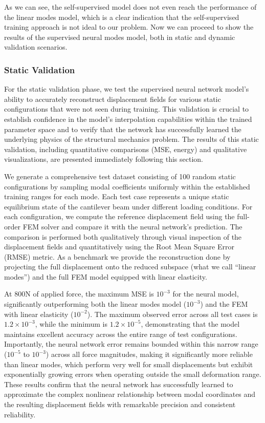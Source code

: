 As we can see, the self-supervised model does not even reach the performance of the linear modes model, which is a clear indication that the self-supervised training approach is not ideal to our problem. Now we can proceed to show the results of the supervised neural modes model, both in static and dynamic validation scenarios.

\subsubsection{Static Validation}
\label{sec:static_validation}
For the static validation phase, we test the supervised neural network model's ability to accurately reconstruct displacement fields for various static configurations that were not seen during training. This validation is crucial to establish confidence in the model's interpolation capabilities within the trained parameter space and to verify that the network has successfully learned the underlying physics of the structural mechanics problem. The results of this static validation, including quantitative comparisons (MSE, energy) and qualitative visualizations, are presented immediately following this section. 


We generate a comprehensive test dataset consisting of 100 random static configurations by sampling modal coefficients uniformly within the established training ranges for each mode. Each test case represents a unique static equilibrium state of the cantilever beam under different loading conditions. For each configuration, we compute the reference displacement field using the full-order FEM solver and compare it with the neural network's prediction. The comparison is performed both qualitatively through visual inspection of the displacement fields and quantitatively using the Root Mean Square Error (RMSE) metric. As a benchmark we provide the reconstruction done by projecting the full displacement onto the reduced subspace (what we call ``linear modes'') and the full FEM model equipped with linear elasticity.

At 800N of applied force, the maximum MSE is $10^{-3}$ for the neural model, significantly outperforming both the linear modes model ($10^{-3}$) and the FEM with linear elasticity ($10^{-2}$). The maximum observed error across all test cases is $1.2 \times 10^{-3}$, while the minimum is $1.2 \times 10^{-5}$, demonstrating that the model maintains excellent accuracy across the entire range of test configurations. Importantly, the neural network error remains bounded within this narrow range ($10^{-5}$ to $10^{-3}$) across all force magnitudes, making it significantly more reliable than linear modes, which perform very well for small displacements but exhibit exponentially growing errors when operating outside the small deformation range. These results confirm that the neural network has successfully learned to approximate the complex nonlinear relationship between modal coordinates and the resulting displacement fields with remarkable precision and consistent reliability.

